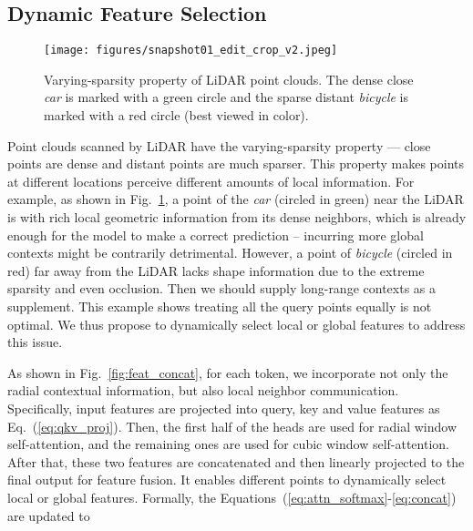 \documentclass[10pt,twocolumn,letterpaper]{article}
\begin{document}
\subsection{Dynamic Feature Selection}
\label{sec:dfs}

\begin{figure}
\begin{center}
\texttt{[image: figures/snapshot01\_edit\_crop\_v2.jpeg]}
\end{center}
\vspace{-0.5cm}
\caption{Varying-sparsity property of LiDAR point clouds. The dense close \textit{car} is marked with a green circle and the sparse distant \textit{bicycle} is marked with a red circle (best viewed in color).}
\label{fig:car_and_bicycle}
\vspace{-0.3cm}
\end{figure}

Point clouds scanned by LiDAR have the varying-sparsity property --- close points are dense and distant points are much sparser. This property makes points at different locations perceive different amounts of local information. For example, as shown in Fig.~\ref{fig:car_and_bicycle}, a point of the \textit{car} (circled in green) near the LiDAR is with rich local geometric information from its dense neighbors, which is already enough for the model to make a correct prediction -- incurring more global contexts might be contrarily detrimental. However, a point of \textit{bicycle} (circled in red) far away from the LiDAR lacks shape information due to the extreme sparsity and even occlusion. Then we should supply long-range contexts as a supplement. This example shows treating all the query points equally is not optimal. We thus propose to dynamically select local or global features to address this issue.

As shown in Fig.~\ref{fig:feat_concat}, for each token, we incorporate not only the radial contextual information, but also local neighbor communication. Specifically, input features are projected into query, key and value features as Eq.~(\ref{eq:qkv_proj}). Then, the first half of the heads are used for radial window self-attention, and the remaining ones are used for cubic window self-attention. After that, these two features are concatenated and then linearly projected to the final output  for feature fusion. It enables different points to dynamically select local or global features.  Formally, the Equations~(\ref{eq:attn_softmax}-\ref{eq:concat}) are updated to
\end{document}
